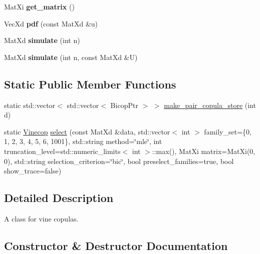 \begin{DoxyCompactItemize}
\item 
Mat\+Xi {\bfseries get\+\_\+matrix} ()\hypertarget{class_vinecop_aa1c2dcb66503749a66f40f2031d99e0b}{}\label{class_vinecop_aa1c2dcb66503749a66f40f2031d99e0b}

\item 
Vec\+Xd {\bfseries pdf} (const Mat\+Xd \&u)\hypertarget{class_vinecop_af7cc5932cd21a4c8b07805ad79911a4f}{}\label{class_vinecop_af7cc5932cd21a4c8b07805ad79911a4f}

\item 
Mat\+Xd {\bfseries simulate} (int n)\hypertarget{class_vinecop_a2a234b3fdfd00e67cf27b5f3deb09873}{}\label{class_vinecop_a2a234b3fdfd00e67cf27b5f3deb09873}

\item 
Mat\+Xd {\bfseries simulate} (int n, const Mat\+Xd \&U)\hypertarget{class_vinecop_a46ab3b783c58fdaa342c17812590d74b}{}\label{class_vinecop_a46ab3b783c58fdaa342c17812590d74b}

\end{DoxyCompactItemize}
\subsection*{Static Public Member Functions}
\begin{DoxyCompactItemize}
\item 
static std\+::vector$<$ std\+::vector$<$ Bicop\+Ptr $>$ $>$ \hyperlink{class_vinecop_a91167c08796a946141e228f87e01b284}{make\+\_\+pair\+\_\+copula\+\_\+store} (int d)
\item 
static \hyperlink{class_vinecop}{Vinecop} \hyperlink{class_vinecop_a40e56d021bbb4f4d462110e6a9039913}{select} (const Mat\+Xd \&data, std\+::vector$<$ int $>$ family\+\_\+set=\{0, 1, 2, 3, 4, 5, 6, 1001\}, std\+::string method=\char`\"{}mle\char`\"{}, int truncation\+\_\+level=std\+::numeric\+\_\+limits$<$ int $>$\+::max(), Mat\+Xi matrix=Mat\+Xi(0, 0), std\+::string selection\+\_\+criterion=\char`\"{}bic\char`\"{}, bool preselect\+\_\+families=true, bool show\+\_\+trace=false)
\end{DoxyCompactItemize}


\subsection{Detailed Description}
A class for vine copulas. 

\subsection{Constructor \& Destructor Documentation}
